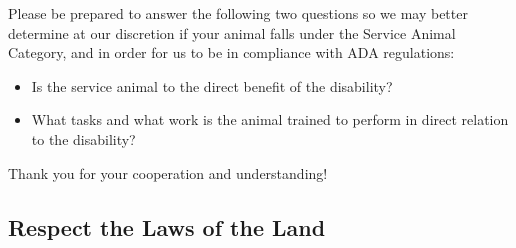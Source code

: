 Please be prepared to answer the following two questions so we may better determine at our discretion if your animal falls under the Service Animal Category, and in order for us to be in compliance with ADA regulations:
%
\begin{itemize}[noitemsep]
\item Is the service animal to the direct benefit of the disability?
\item What tasks and what work is the animal trained to perform in direct relation to the disability? 
\end{itemize}
 



Thank you for your cooperation and understanding!


\subsection*{Respect the Laws of the Land}

